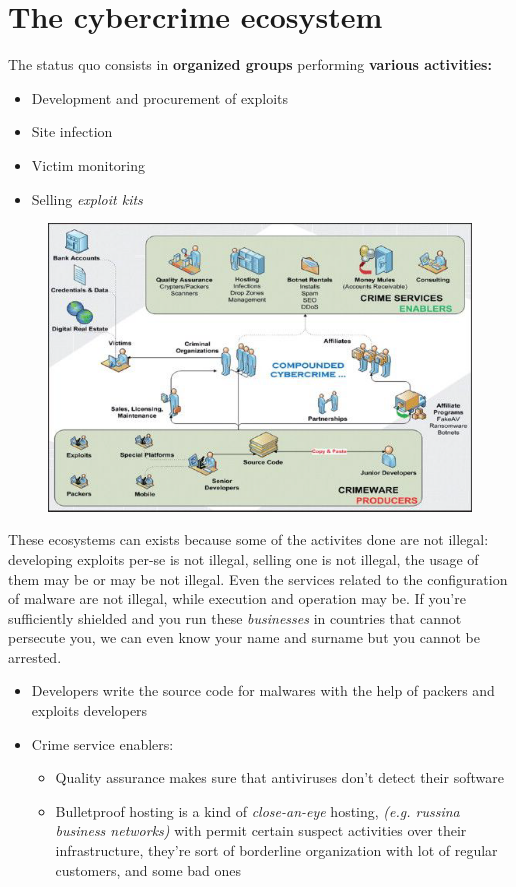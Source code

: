 \section{The cybercrime ecosystem}
    The status quo consists in \textbf{organized groups} performing \textbf{various activities:}
    \begin{itemize}
        \item Development and procurement of exploits
        \item Site infection
        \item Victim monitoring
        \item Selling \textit{exploit kits}
    \end{itemize}
    \begin{figure}[ht!]
        \centering
        \includegraphics[width=0.6\linewidth]{ecosystem.png}
    \end{figure}
    These ecosystems can exists because some of the activites done are not illegal: developing exploits per-se is not illegal, selling one is not illegal, the usage of them may be or may be not illegal.
    Even the services related to the configuration of malware are not illegal, while execution and operation may be.
    If you're sufficiently shielded and you run these \textit{businesses} in countries that cannot persecute you, we can even know your name and surname but you cannot be arrested.
    \begin{itemize}
        \item Developers write the source code for malwares with the help of packers and exploits developers
        \item Crime service enablers:
        \begin{itemize}
            \item Quality assurance makes sure that antiviruses don't detect their software
            \item Bulletproof hosting is a kind of \textit{close-an-eye} hosting, \textit{(e.g. russina business networks)} with permit certain suspect activities over their infrastructure, they're sort of borderline organization with lot of regular customers, and some bad ones
        \end{itemize}
    \end{itemize}
